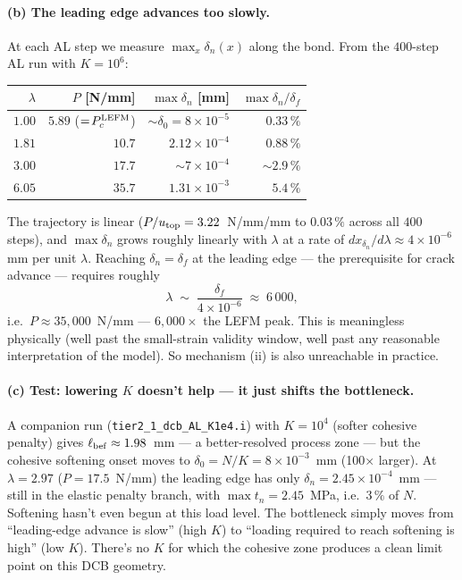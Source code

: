 \paragraph{(b) The leading edge advances too slowly.}
At each AL step we measure $\max_x \delta_n(x)$ along the bond. From
the $400$-step AL run with $K = 10^{6}$:
\begin{table}[h]
\centering
\small
\begin{tabular}{rrrr}
\toprule
$\lambda$ & $P$ [N/mm] & $\max\delta_n$ [mm] & $\max\delta_n / \delta_f$ \\
\midrule
$1.00$ & $5.89$ ($=\!P_c^{\rm LEFM}$) & $\sim\!\delta_0 = 8\times 10^{-5}$ & $0.33\,\%$ \\
$1.81$ & $10.7$  & $2.12\times 10^{-4}$ & $0.88\,\%$ \\
$3.00$ & $17.7$  & $\sim\!7\times 10^{-4}$ & $\sim\!2.9\,\%$ \\
$6.05$ & $35.7$  & $1.31\times 10^{-3}$ & $5.4\,\%$ \\
\bottomrule
\end{tabular}
\end{table}
The trajectory is linear ($P/u_{\rm top} = 3.22$~N/mm/mm to $0.03\,\%$
across all $400$ steps), and $\max\delta_n$ grows roughly linearly with
$\lambda$ at a rate of $dx_{\delta_n}/d\lambda \approx 4\times 10^{-6}$
mm per unit $\lambda$. Reaching $\delta_n = \delta_f$ at the leading
edge — the prerequisite for crack advance — requires roughly
\begin{equation}
\lambda \;\sim\; \frac{\delta_f}{4\times 10^{-6}}
\;\approx\; 6\,000,
\end{equation}
i.e.\ $P \approx 35{,}000$~N/mm — $6{,}000\!\times$ the LEFM peak.
This is meaningless physically (well past the small-strain validity
window, well past any reasonable interpretation of the model). So
mechanism (ii) is also unreachable in practice.

\paragraph{(c) Test: lowering $K$ doesn't help — it just shifts the bottleneck.}
A companion run (\texttt{tier2\_1\_dcb\_AL\_K1e4.i}) with $K = 10^{4}$
(softer cohesive penalty) gives $\ell_{\rm bef} \approx 1.98$~mm — a
better-resolved process zone — but the cohesive softening onset moves
to $\delta_0 = N/K = 8\times 10^{-3}$~mm (100$\times$ larger). At
$\lambda = 2.97$ ($P = 17.5$~N/mm) the leading edge has only $\delta_n
= 2.45\times 10^{-4}$~mm — still in the elastic penalty branch, with
$\max t_n = 2.45$~MPa, i.e.\ $3\,\%$ of $N$. Softening hasn't even
begun at this load level. The bottleneck simply moves from
``leading-edge advance is slow'' (high $K$) to ``loading required to
reach softening is high'' (low $K$). There's no $K$ for which the
cohesive zone produces a clean limit point on this DCB geometry.

